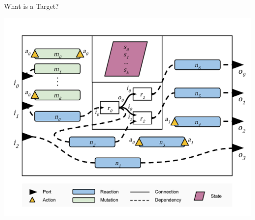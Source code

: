 \documentclass[aspectratio=169]{beamer}
\begin{document}
\begin{frame}{What is a Target?}
\begin{center}
\includegraphics[scale=0.28]{reactor-overview}
\end{center}
\end{frame}

\end{document}
